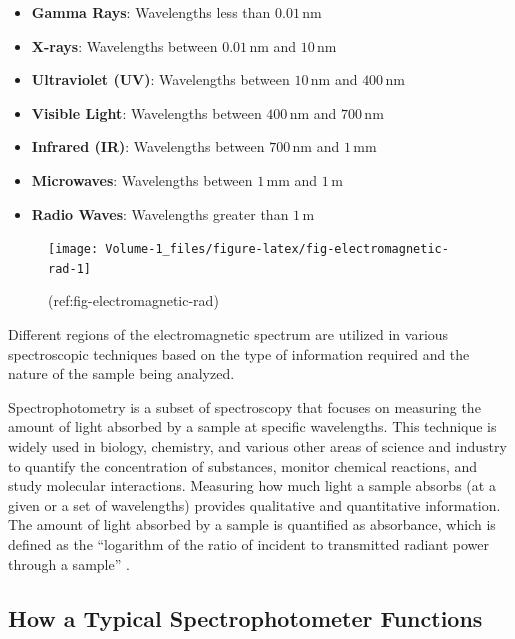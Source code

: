 \documentclass[
  9pt,
  american,
  a5paper,
  extrafontsizes,onecolumn,openright
  ]{memoir}
\providecommand{\tightlist}{%
  \setlength{\itemsep}{0pt}\setlength{\parskip}{0pt}}
\begin{document}
\begin{itemize}
\tightlist
\item
  \textbf{Gamma Rays}: Wavelengths less than \(0.01 \, \text{nm}\)
\item
  \textbf{X-rays}: Wavelengths between \(0.01 \, \text{nm}\) and \(10 \, \text{nm}\)
\item
  \textbf{Ultraviolet (UV)}: Wavelengths between \(10 \, \text{nm}\) and \(400 \, \text{nm}\)
\item
  \textbf{Visible Light}: Wavelengths between \(400 \, \text{nm}\) and \(700 \, \text{nm}\)
\item
  \textbf{Infrared (IR)}: Wavelengths between \(700 \, \text{nm}\) and \(1 \, \text{mm}\)
\item
  \textbf{Microwaves}: Wavelengths between \(1 \, \text{mm}\) and \(1 \, \text{m}\)
\item
  \textbf{Radio Waves}: Wavelengths greater than \(1 \, \text{m}\)
\end{itemize}

\scriptsize

\begin{figure}

{\centering \texttt{[image: Volume-1\_files/figure-latex/fig-electromagnetic-rad-1]} 

}

\caption{(ref:fig-electromagnetic-rad)}\label{fig:fig-electromagnetic-rad}
\end{figure}

\normalsize

Different regions of the electromagnetic spectrum are utilized in various spectroscopic techniques based on the type of information required and the nature of the sample being analyzed.

Spectrophotometry is a subset of spectroscopy that focuses on measuring the amount of light absorbed by a sample at specific wavelengths. This technique is widely used in biology, chemistry, and various other areas of science and industry to quantify the concentration of substances, monitor chemical reactions, and study molecular interactions. Measuring how much light a sample absorbs (at a given or a set of wavelengths) provides qualitative and quantitative information. The amount of light absorbed by a sample is quantified as absorbance, which is defined as the \enquote{logarithm of the ratio of incident to transmitted radiant power through a sample} \autocite{gold_iupac_2019}.

\subsection{How a Typical Spectrophotometer Functions}\label{how-a-typical-spectrophotometer-functions}
\end{document}
